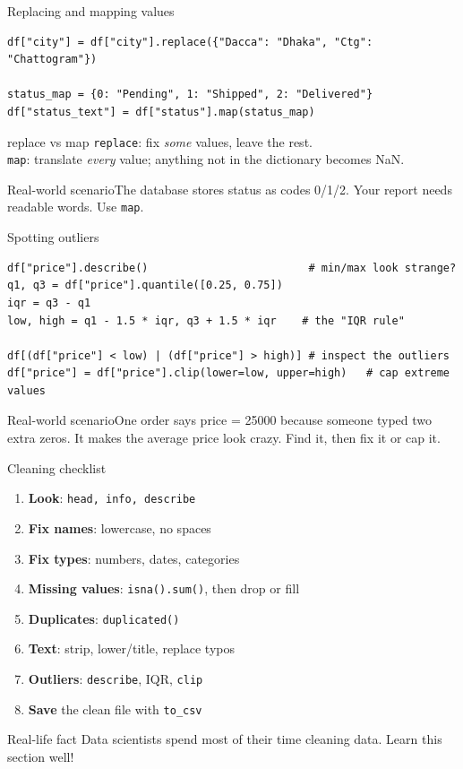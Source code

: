 \documentclass[aspectratio=169,10pt]{beamer}
\newcommand{\code}[1]{\texttt{#1}}
\newcommand{\scenario}[1]{\begin{exampleblock}{Real-world scenario}#1\end{exampleblock}}
\begin{document}
\begin{frame}[fragile]{Replacing and mapping values}
\begin{lstlisting}
df["city"] = df["city"].replace({"Dacca": "Dhaka", "Ctg": "Chattogram"})

status_map = {0: "Pending", 1: "Shipped", 2: "Delivered"}
df["status_text"] = df["status"].map(status_map)
\end{lstlisting}
  \begin{block}{replace vs map}
    \code{replace}: fix \emph{some} values, leave the rest. \\
    \code{map}: translate \emph{every} value; anything not in the dictionary becomes NaN.
  \end{block}
  \scenario{The database stores status as codes 0/1/2. Your report needs readable words.
  Use \code{map}.}
\end{frame}

\begin{frame}[fragile]{Spotting outliers}
\begin{lstlisting}
df["price"].describe()                         # min/max look strange?
q1, q3 = df["price"].quantile([0.25, 0.75])
iqr = q3 - q1
low, high = q1 - 1.5 * iqr, q3 + 1.5 * iqr    # the "IQR rule"

df[(df["price"] < low) | (df["price"] > high)] # inspect the outliers
df["price"] = df["price"].clip(lower=low, upper=high)   # cap extreme values
\end{lstlisting}
  \scenario{One order says price = 25000 because someone typed two extra zeros. It makes the
  average price look crazy. Find it, then fix it or cap it.}
\end{frame}

\begin{frame}{Cleaning checklist}
  \begin{enumerate}
    \item \textbf{Look}: \code{head, info, describe}
    \item \textbf{Fix names}: lowercase, no spaces
    \item \textbf{Fix types}: numbers, dates, categories
    \item \textbf{Missing values}: \code{isna().sum()}, then drop or fill
    \item \textbf{Duplicates}: \code{duplicated()}
    \item \textbf{Text}: strip, lower/title, replace typos
    \item \textbf{Outliers}: \code{describe}, IQR, \code{clip}
    \item \textbf{Save} the clean file with \code{to\_csv}
  \end{enumerate}
  \begin{block}{Real-life fact}
    Data scientists spend most of their time cleaning data. Learn this section well!
  \end{block}
\end{frame}
\end{document}
